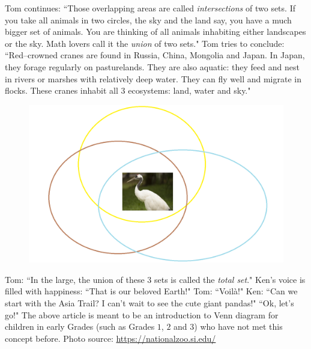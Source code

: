 \begin{multicols}{2}
\begin{figure}[H]
		\end{figure}
	Tom continues: ``Those overlapping areas are called \textit{intersections} of two sets. If you take all animals in two circles, the sky and the land say, you have a much bigger set of animals. You are thinking of all animals inhabiting either landscapes or the sky. Math lovers call it the \textit{union} of two sets." 
	\vskip 0.1cm
	Tom tries to conclude: ``Red--crowned cranes are found in Russia, China, Mongolia and Japan. In Japan, they forage regularly on pasturelands. They are also aquatic: they feed and nest in rivers or marshes with relatively deep water. They can fly well and migrate in flocks. These cranes inhabit all $3$ ecosystems: land, water and sky." 
	\begin{figure}[H]
			\vspace*{-5pt}
			\centering
			\captionsetup{labelformat= empty, justification=centering}
			\includegraphics[width= 0.7\linewidth]{p4}
			\vspace*{-10pt}
		\end{figure}
	Tom: ``In the large, the union of these $3$ sets is called the \textit{total set}."
	\vskip 0.1cm
	Ken's voice is filled with happiness: ``That is our beloved Earth!"
	\vskip 0.1cm
	Tom: ``Voilà!"
	\vskip 0.1cm
	Ken: ``Can we start with the Asia Trail? I can't wait to see the cute giant pandas!"
	\vskip 0.1cm
	``Ok, let's go!"
	\vskip 0.1cm
	The above article is meant to be an introduction to Venn diagram for children in early Grades (such as Grades $1$, $2$ and $3$) who have not met this concept before.
	\vskip 0.1cm
	Photo source: \url{https://nationalzoo.si.edu/}
	\vskip 0.1cm
\end{multicols}
